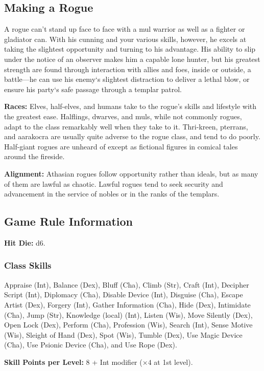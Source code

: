 \subsection{Making a Rogue}

A rogue can't stand up face to face with a mul warrior as well as a fighter or gladiator can. With his cunning and your various skills, however, he excels at taking the slightest opportunity and turning to his advantage. His ability to slip under the notice of an observer makes him a capable lone hunter, but his greatest strength are found through interaction with allies and foes, inside or outside, a battle—he can use his enemy`s slightest distraction to deliver a lethal blow, or ensure his party`s safe passage through a templar patrol.

\textbf{Races:} Elves, half-elves, and humans take to the rogue's skills and lifestyle with the greatest ease. Halflings, dwarves, and muls, while not commonly rogues, adapt to the class remarkably well when they take to it. Thri-kreen, pterrans, and aarakocra are usually quite adverse to the rogue class, and tend to do poorly. Half-giant rogues are unheard of except as fictional figures in comical tales around the fireside.

\textbf{Alignment:} Athasian rogues follow opportunity rather than ideals, but as many of them are lawful as chaotic. Lawful rogues tend to seek security and advancement in the service of nobles or in the ranks of the templars.

\subsection{Game Rule Information}
\textbf{Hit Die:} d6.

\subsubsection{Class Skills}
Appraise (Int), Balance (Dex), Bluff (Cha), Climb (Str), Craft (Int), Decipher Script (Int), Diplomacy (Cha), Disable Device (Int), Disguise (Cha), Escape Artist (Dex), Forgery (Int), Gather Information (Cha), Hide (Dex), Intimidate (Cha), Jump (Str), Knowledge (local) (Int), Listen (Wis), Move Silently (Dex), Open Lock (Dex), Perform (Cha), Profession (Wis), Search (Int), Sense Motive (Wis), Sleight of Hand (Dex), Spot (Wis), Tumble (Dex), Use Magic Device (Cha), Use Psionic Device (Cha), and Use Rope (Dex).

\textbf{Skill Points per Level:} 8 + Int modifier ($\times4$ at 1st level).

